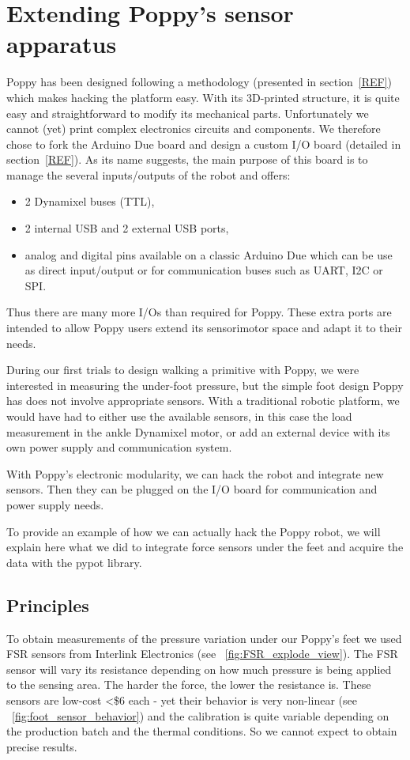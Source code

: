 
\newpage
\section{Extending Poppy’s sensor apparatus} %
\label{sec:morphology-adding-mechanism}


Poppy has been designed following a methodology (presented in section~\ref{REF}) which makes hacking the platform easy. With its 3D-printed structure, it is quite easy and straightforward to modify its mechanical parts. Unfortunately we cannot (yet) print complex electronics circuits and components. We therefore chose to fork the Arduino Due board and design a custom I/O board (detailed in section~\ref{REF}). As its name suggests, the main purpose of this board is to manage the several inputs/outputs of the robot and offers:
\begin{itemize}
    \item 2 Dynamixel buses (TTL),
    \item 2 internal USB and 2 external USB ports,
    \item analog and digital pins available on a classic Arduino Due which can be use as direct input/output or for communication buses such as UART, I2C or SPI.
\end{itemize}
Thus there are many more I/Os than required for Poppy. These extra ports are intended to allow Poppy users extend its sensorimotor space and adapt it to their needs.


During our first trials to design walking a primitive with Poppy, we were interested in measuring the under-foot pressure, but the simple foot design Poppy has does not involve appropriate sensors. With a traditional robotic platform, we would have had to either use the available sensors, in this case the load measurement in the ankle Dynamixel motor, or add an external device with its own power supply and communication system.

With Poppy’s electronic modularity, we can hack the robot and integrate new sensors. Then they can be plugged on the I/O board for communication and power supply needs.

To provide an example of how we can actually hack the Poppy robot, we will explain here what we did to integrate force sensors under the feet and acquire the data with the pypot library.

\subsection{Principles} %
To obtain measurements of the pressure variation under our Poppy's feet we used FSR sensors from Interlink Electronics (see \figurename~\ref{fig:FSR_explode_view}). The FSR sensor will vary its resistance depending on how much pressure is being applied to the sensing area. The harder the force, the lower the resistance is. These sensors are low-cost <\$6 each - yet their behavior is very non-linear (see \figurename~\ref{fig:foot_sensor_behavior}) and the calibration is quite variable depending on the production batch and the thermal conditions. So we cannot expect to obtain precise results.

